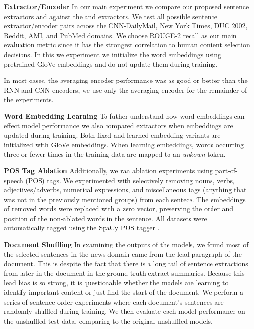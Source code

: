 
\textbf{Extractor/Encoder} In our main experiment we compare our proposed 
sentence extractors \modelOneBF
and \modelTwoBF against the \baselineOneBF and \baselineTwoBF extractors.
We test all possible sentence extractor/encoder pairs across the CNN-DailyMail,
New York Times, DUC 2002, Reddit, AMI, and PubMed domains. We choose ROUGE-2
recall as our main evaluation metric since it has the strongest correlation
to human content selection decisions. In this we experiment we initialize
the word embeddings using pretrained GloVe embeddings \cite{glove} and do 
not update them during training.

In most cases, the averaging encoder performance was as good or better than
the RNN and CNN encoders, we use only the averaging encoder for the remainder
of the experiments.

\textbf{Word Embedding Learning} To futher understand how word 
embeddings 
can
effect model performance we also compared extractors when embeddings 
are updated during training. Both fixed and learned embedding variants are 
initialized with GloVe embeddings. When learning embeddings, words occurring 
three or fewer times in the training data are mapped to an \textit{unkown}
token.

\textbf{POS Tag Ablation} Additionally, we ran ablation experiments
using part-of-speech (POS) tags. We experimented with selectively removing 
nouns, verbs, adjectives/adverbs, numerical expressions, and miscellaneous
tags (anything that was not in the previously mentioned groups) from each sentece. The embeddings of removed words were replaced with a zero vector,
preserving the order and position of the non-ablated words in the sentence.
All datasets were automatically tagged using
the SpaCy POS tagger \cite{spacy}.   


\textbf{Document Shuffling} In examining the outputs of the models, we found
most of the selected sentences in the news domain came from the lead paragraph
of the document. This is despite the fact that there is a long tail of 
sentence extractions from later in the document in the ground truth extract 
summaries. Because this lead bias is so strong, it is questionable whether
the models are learning to identify important content or just find the start
of the document. We perform a series of sentence order experiments where 
each document's sentences are randomly shuffled during training. We then
evaluate each model performance on the unshuffled test data, comparing to 
the original unshuffled models. 


